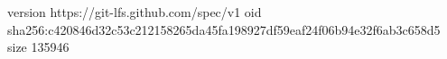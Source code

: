 version https://git-lfs.github.com/spec/v1
oid sha256:c420846d32c53c212158265da45fa198927df59eaf24f06b94e32f6ab3c658d5
size 135946
